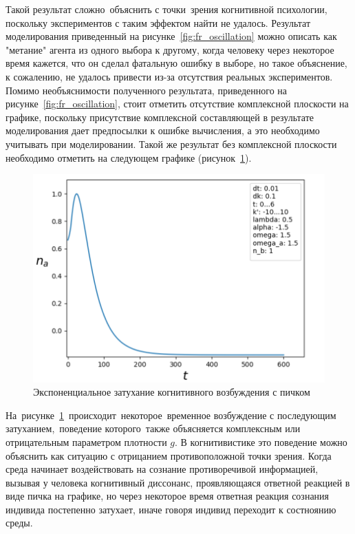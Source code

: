 Такой результат сложно~объяснить с точки~зрения когнитивной психологии, поскольку экспериментов с таким
эффектом найти не удалось.
Результат моделирования приведенный на рисунке~\ref{fig:fr_oscillation} можно описать как "метание"
агента из одного выбора к другому, когда человеку через некоторое время кажется, что он сделал фатальную
ошибку в выборе, но такое объяснение, к сожалению, не удалось привести из-за отсутствия реальных
экспериментов.
Помимо необъяснимости полученного результата, приведенного на рисунке~\ref{fig:fr_oscillation}, стоит
отметить отсутствие комплексной плоскости на графике, поскольку присутствие комплексной составляющей
в результате моделирования дает предпосылки к ошибке вычисления, а это необходимо учитывать при моделировании.
Такой же результат без комплексной плоскости необходимо отметить на следующем графике (рисунок~\ref{fig:fr_next}).
\begin{figure}[h!]
    \centering
    \captionsetup{justification=centering}
    \includegraphics[width=0.7\linewidth]{pictures/result_first_2.png}
    \caption{Экспоненциальное затухание когнитивного возбуждения с пичком}
    \label{fig:fr_next}
\end{figure}

На~рисунке~\ref{fig:fr_next}~происходит~некоторое~временное возбуждение с последующим затуханием,~поведение
которого~также объясняется комплексным или отрицательным параметром плотности $g$.
В когнитивистике это поведение можно объяснить как ситуацию с отрицанием противоположной точки зрения.
Когда среда начинает воздействовать на сознание противоречивой информацией, вызывая у человека когнитивный
диссонанс, проявляющаяся ответной реакцией в виде пичка на графике, но через некоторое время ответная
реакция сознания индивида постепенно затухает, иначе говоря индивид переходит к состноянию среды.

